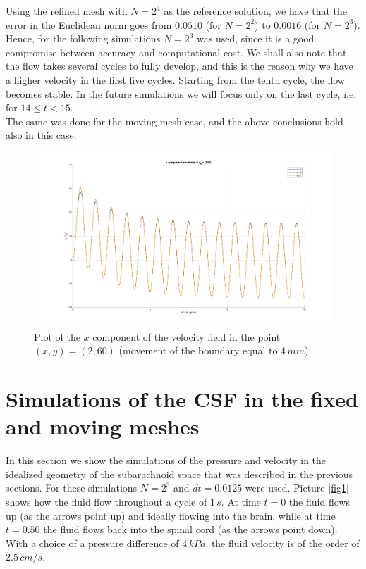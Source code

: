 \documentclass[a4paper,11pt,openright,twoside]{book}
\begin{document}
Using the refined mesh with $N=2^4$ as the reference solution, we have that the error in the Euclidean norm goes from $0.0510$ (for $N=2^2$) to $0.0016$ (for $N=2^3$). Hence, for the following simulations $N=2^3$ was used, since it is a good compromise between accuracy and computational cost.
We shall also note that the flow takes several cycles to fully develop, and this is the reason why we have a higher velocity in the first five cycles. Starting from the tenth cycle, the flow becomes stable. In the future simulations we will focus only on the last cycle, i.e. for $14 \leq t < 15$. \\

The same was done for the moving mesh case, and the above conclusions hold also in this case.

\begin{figure}[h!]
\centering
\includegraphics[width=\textwidth]{images/mesh_refinement_ampl.png}
\caption{Plot of the $x$ component of the velocity field in the point $(x,y)=(2,60)$ (movement of the boundary equal to $4 \, mm$).}
\label{img:sas:2}
\end{figure}

\section{Simulations of the CSF in the fixed and moving meshes}
In this section we show the simulations of the pressure and velocity in the idealized geometry of the subarachnoid space that was described in the previous sections. For these simulations $N = 2^3$ and $dt = 0.0125$ were used. Picture \ref{fig1} shows how the fluid flow throughout a cycle of $1 \, s$. At time $t = 0$ the fluid flows up (as the arrows point up) and ideally flowing into the brain, while at time $t = 0.50$ the fluid flows back into the spinal cord (as the arrows point down). With a choice of a pressure difference of $4 \, kPa$, the fluid velocity is of the order of $2.5 \, cm/s$. \\
\end{document}
